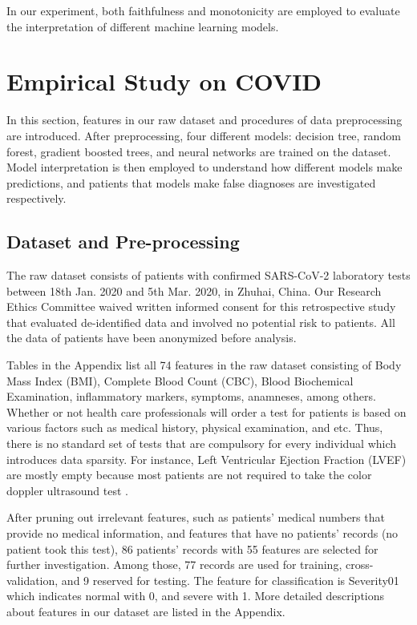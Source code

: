 In our experiment, both faithfulness and monotonicity are employed to evaluate the interpretation of different machine learning models. 

\section{Empirical Study on COVID}

In this section, features in our raw dataset and procedures of data preprocessing are introduced. After preprocessing, four different models: decision tree, random forest, gradient boosted trees, and neural networks are trained on the dataset. Model interpretation is then employed to understand how different models make predictions, and patients that models make false diagnoses are investigated respectively.

\subsection{Dataset and Pre-processing}

The raw dataset consists of patients with confirmed SARS-CoV-2 laboratory tests between 18th Jan. 2020 and 5th Mar. 2020, in Zhuhai, China. Our Research Ethics Committee waived written informed consent for this retrospective study that evaluated de-identified data and involved no potential risk to patients. All the data of patients have been anonymized before analysis.

Tables in the Appendix list all 74 features in the raw dataset consisting of Body Mass Index (BMI), Complete Blood Count (CBC), Blood Biochemical Examination, inflammatory markers, symptoms, anamneses, among others. Whether or not health care professionals will order a test for patients is based on various factors such as medical history, physical examination, and etc. Thus, there is no standard set of tests that are compulsory for every individual which introduces data sparsity. For instance, Left Ventricular Ejection Fraction (LVEF) are mostly empty because most patients are not required to take the color doppler ultrasound test .

\color{black}
After pruning out irrelevant features, such as patients' medical numbers that provide no medical information, and features that have no patients' records (no patient took this test), 86 patients' records with 55 features are selected for further investigation. Among those, 77 records are used for training, cross-validation, and 9 reserved for testing. The feature for classification is Severity01 which indicates normal with 0, and severe with 1. More detailed descriptions about features in our dataset are listed in the Appendix.

